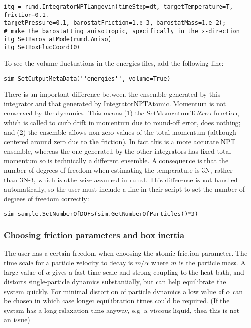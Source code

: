 \documentclass[a4paper]{article}
\begin{document}
\begin{verbatim}
itg = rumd.IntegratorNPTLangevin(timeStep=dt, targetTemperature=T, friction=0.1,
targetPressure=0.1, barostatFriction=1.e-3, barostatMass=1.e-2);
# make the barostatting anisotropic, specifically in the x-direction
itg.SetBarostatMode(rumd.Aniso)
itg.SetBoxFlucCoord(0)
\end{verbatim}

To see the volume fluctuations in the energies files, add the following line:

\begin{verbatim}
sim.SetOutputMetaData(''energies'', volume=True)
\end{verbatim}

There is an important difference between the ensemble generated by this integrator and that generated by IntegratorNPTAtomic. Momentum is not conserved by the dynamics. This means (1) the SetMomentumToZero function, which is called to curb drift in momentum due to round-off error, does nothing; and (2) the ensemble allows non-zero values of the total momentum (although centered around zero due to the friction). In fact this is a more accurate NPT ensemble, whereas the one generated by the other integrators has fixed total momentum so is technically a different ensemble. A consequence is that the number of degrees of freedom when estimating the temperature is 3N, rather than 3N-3, which is otherwise assumed in rumd. This difference is not handled automatically, so the user must include a line in their script to set the number of degrees of freedom correctly:

\begin{verbatim}
sim.sample.SetNumberOfDOFs(sim.GetNumberOfParticles()*3)
\end{verbatim}


\subsubsection{Choosing friction parameters and box inertia}

The user has a certain freedom when choosing the atomic friction parameter. The time scale for a particle velocity to decay is $m/\alpha$ where $m$ is the particle mass. A large value of $\alpha$ gives a fast time scale and strong coupling to the heat bath, and distorts single-particle dynamics substantially, but can help equilibrate the system quickly. For minimal distortion of particle dynamics a low value of $\alpha$ can be chosen in which case longer equilibration times could be required. (If the system has a long relaxation time anyway, e.g. a viscous liquid, then this is not an issue).
\end{document}
